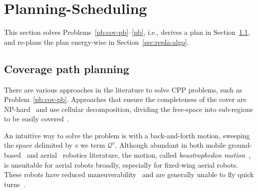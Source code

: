 \documentclass[letterpaper,10pt,journal,twoside]{IEEEtran}
\theoremstyle{definition}
\begin{document}





\section{Planning-Scheduling}  %
\label{sec:algo}               %
This section solves Problems~\ref{pb:cov-pb}--\ref{pb}, i.e., derives a plan in Section~\ref{sec:cov-algo}, and re-plans the plan energy-wise in Section~\ref{sec:repla-algo}.

\subsection{Coverage path planning}
\label{sec:cov-algo}

There are various approaches in the literature to solve CPP problems, such as Problem~\ref{pb:cov-pb}. Approaches that ensure the completeness of the cover are NP-hard~\cite{arkin2000approximation} and use cellular decomposition, dividing the free-space into sub-regions to be easily covered~\cite{choset2001coverage,galceran2013survey}.

An intuitive way to solve the problem is with a back-and-forth motion, sweeping the space delimited by $v$ we term $\mathcal{Q}^v$. Although abundant in both mobile ground-based~\cite{choset2001coverage,choset2005principles,lavalle2006planning} and aerial~\cite{araujo2013multiple,artemenko2016energy,cabreira2018energy,difranco2015energy} robotics literature, the motion, called \emph{boustrophedon motion}~\cite{choset2001coverage}, is unsuitable for aerial robots broadly, especially for fixed-wing aerial robots. These robots have reduced maneuverability~\cite{dille2013efficient,mannadiar2010optimal,xu2011optimal,xu2014efficient} and are generally unable to fly quick turns~\cite{wang2017curvature}.
\end{document}
